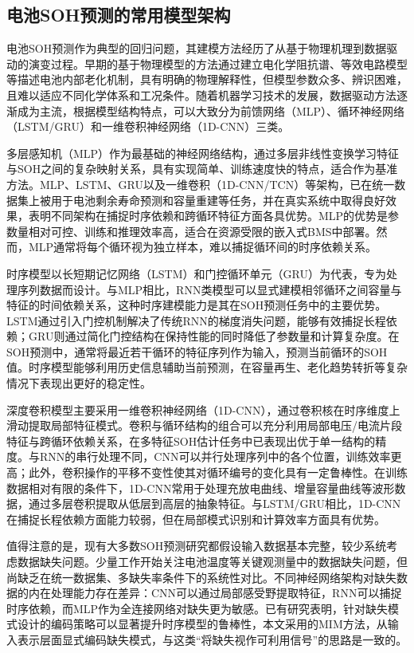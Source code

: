 \documentclass[10pt,a4paper]{ctexart}
\begin{document}
\subsection{电池SOH预测的常用模型架构}

电池SOH预测作为典型的回归问题，其建模方法经历了从基于物理机理到数据驱动的演变过程\cite{liu2025deep}。早期的基于物理模型的方法通过建立电化学阻抗谱、等效电路模型等描述电池内部老化机制，具有明确的物理解释性，但模型参数众多、辨识困难，且难以适应不同化学体系和工况条件。随着机器学习技术的发展，数据驱动方法逐渐成为主流\cite{liu2025deep}，根据模型结构特点，可以大致分为前馈网络（MLP）、循环神经网络（LSTM/GRU）和一维卷积神经网络（1D-CNN）三类。

多层感知机（MLP）作为最基础的神经网络结构，通过多层非线性变换学习特征与SOH之间的复杂映射关系，具有实现简单、训练速度快的特点，适合作为基准方法\cite{bairwa2025cycle}。MLP、LSTM、GRU以及一维卷积（1D-CNN/TCN）等架构，已在统一数据集上被用于电池剩余寿命预测和容量重建等任务，并在真实系统中取得良好效果\cite{bairwa2025cycle}，表明不同架构在捕捉时序依赖和跨循环特征方面各具优势。MLP的优势是参数量相对可控、训练和推理效率高，适合在资源受限的嵌入式BMS中部署。然而，MLP通常将每个循环视为独立样本，难以捕捉循环间的时序依赖关系。

时序模型以长短期记忆网络（LSTM）和门控循环单元（GRU）为代表，专为处理序列数据而设计\cite{bairwa2025cycle}。与MLP相比，RNN类模型可以显式建模相邻循环之间容量与特征的时间依赖关系，这种时序建模能力是其在SOH预测任务中的主要优势。LSTM通过引入门控机制解决了传统RNN的梯度消失问题，能够有效捕捉长程依赖；GRU则通过简化门控结构在保持性能的同时降低了参数量和计算复杂度。在SOH预测中，通常将最近若干循环的特征序列作为输入，预测当前循环的SOH值。时序模型能够利用历史信息辅助当前预测，在容量再生、老化趋势转折等复杂情况下表现出更好的稳定性。

深度卷积模型主要采用一维卷积神经网络（1D-CNN），通过卷积核在时序维度上滑动提取局部特征模式\cite{zhang2024cnnsoh}。卷积与循环结构的组合可以充分利用局部电压/电流片段特征与跨循环依赖关系，在多特征SOH估计任务中已表现出优于单一结构的精度\cite{zhang2024cnnsoh}。与RNN的串行处理不同，CNN可以并行处理序列中的各个位置，训练效率更高；此外，卷积操作的平移不变性使其对循环编号的变化具有一定鲁棒性。在训练数据相对有限的条件下，1D-CNN常用于处理充放电曲线、增量容量曲线等波形数据，通过多层卷积提取从低层到高层的抽象特征。与LSTM/GRU相比，1D-CNN在捕捉长程依赖方面能力较弱，但在局部模式识别和计算效率方面具有优势。

值得注意的是，现有大多数SOH预测研究都假设输入数据基本完整，较少系统考虑数据缺失问题\cite{shao2025soh,deng2025novel}。少量工作开始关注电池温度等关键观测量中的数据缺失问题，但尚缺乏在统一数据集、多缺失率条件下的系统性对比\cite{shao2025soh}。不同神经网络架构对缺失数据的内在处理能力存在差异：CNN可以通过局部感受野提取特征，RNN可以捕捉时序依赖，而MLP作为全连接网络对缺失更为敏感。已有研究表明，针对缺失模式设计的编码策略可以显著提升时序模型的鲁棒性\cite{che2018recurrent}，本文采用的MIM方法，从输入表示层面显式编码缺失模式，与这类“将缺失视作可利用信号”的思路是一致的。
\end{document}
